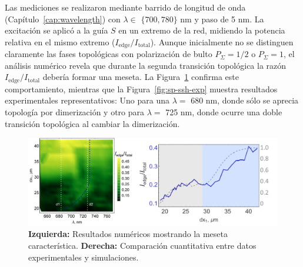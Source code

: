 Las mediciones se realizaron mediante barrido de longitud de onda (Capítulo~\ref{cap:wavelength}) con $\lambda \in$ $\{700, 780\}$ nm y paso de 5 nm. La excitación se aplicó a la guía $S$ en un extremo de la red, midiendo la potencia relativa en el mismo extremo ($I_{\text{edge}}/I_{\text{total}}$). Aunque inicialmente no se distinguen claramente las fases topológicas con polarización de bulto $P_\Sigma=1/2$ o $P_\Sigma=1$, el análisis numérico revela que durante la segunda transición topológica la razón $I_{\text{edge}}/I_{\text{total}}$ debería formar una meseta. La Figura~\ref{fig:sp-ssh-num} confirma este comportamiento, mientras que la Figura~\ref{fig:sp-ssh-exp} muestra resultados experimentales representativos: Uno para una $\lambda =$ 680 nm, donde sólo se aprecia topología por dimerización y otro para $\lambda =$ 725 nm, donde ocurre una doble transición topológica al cambiar la dimerización.

\begin{figure}[H]
	\centering
	\includegraphics[width=0.9\linewidth]{media/sp-ssh-exp-num.png}
	\caption[Análisis numérico-experimental del modelo SP-SSH]{
		\textbf{Izquierda:} Resultados numéricos mostrando la meseta característica. 
		\textbf{Derecha:} Comparación cuantitativa entre datos experimentales y simulaciones.
		\label{fig:sp-ssh-num}}
\end{figure}

